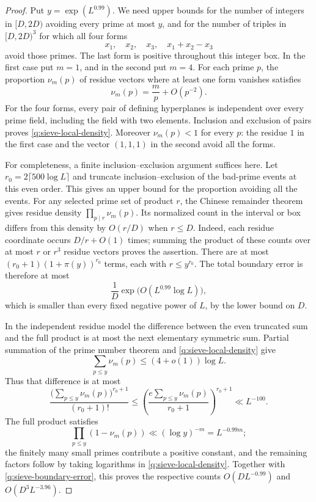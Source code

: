 \begin{proof}
Put $y=\exp(L^{0.99})$. We need upper bounds for the number of integers
in $[D,2D)$ avoiding every prime at most $y$, and for the number of triples
in $[D,2D)^3$ for which all four forms
\[
 x_1,\quad x_2,\quad x_3,\quad x_1+x_2-x_3
\]
avoid those primes. The last form is positive throughout this integer box.
In the first case put $m=1$, and in the second put $m=4$. For each prime $p$,
the proportion $\nu_m(p)$ of residue vectors where at least one form
vanishes satisfies
\begin{equation}\label{q:sieve-local-density}
 \nu_m(p)=\frac mp+O(p^{-2}).
\end{equation}
For the four forms, every pair of defining hyperplanes is independent over
every prime field, including the field with two elements. Inclusion and
exclusion of pairs proves \eqref{q:sieve-local-density}. Moreover
$\nu_m(p)<1$ for every $p$: the residue $1$ in the first case and the vector
$(1,1,1)$ in the second avoid all the forms.

For completeness, a finite inclusion--exclusion argument suffices here.
Let $r_0=2\lceil500\log L\rceil$ and truncate inclusion--exclusion of the
bad-prime events at this even order. This gives an upper bound for the
proportion avoiding all the events. For any selected prime set of product
$r$, the Chinese remainder theorem gives residue density
$\prod_{p\mid r}\nu_m(p)$. Its normalized count in the interval or box
differs from this density by $O(r/D)$ when $r\le D$. Indeed, each residue
coordinate occurs $D/r+O(1)$ times; summing the product of these counts over
at most $r$ or $r^3$ residue vectors proves the assertion.
There are at most
$(r_0+1)(1+\pi(y))^{r_0}$ terms, each with $r\le y^{r_0}$.
The total boundary error is therefore at most
\begin{equation}\label{q:sieve-boundary-error}
 \frac1D\exp\bigl(O(L^{0.99}\log L)\bigr),
\end{equation}
which is smaller than every fixed negative power of $L$, by the lower bound
on $D$.

In the independent residue model the difference between the even truncated
sum and the full product is at most the next elementary symmetric sum.
Partial summation of the prime number theorem and
\eqref{q:sieve-local-density} give
\[
 \sum_{p\le y}\nu_m(p)\le(4+o(1))\log L.
\]
Thus that difference is at most
\[
 \frac{\bigl(\sum_{p\le y}\nu_m(p)\bigr)^{r_0+1}}{(r_0+1)!}
 \le
 \left(\frac{e\sum_{p\le y}\nu_m(p)}{r_0+1}\right)^{r_0+1}
 \ll L^{-100}.
\]
The full product satisfies
\[
 \prod_{p\le y}(1-\nu_m(p))\ll(\log y)^{-m}=L^{-0.99m};
\]
the finitely many small primes contribute a positive constant, and the
remaining factors follow by taking logarithms in
\eqref{q:sieve-local-density}. Together with
\eqref{q:sieve-boundary-error}, this proves the respective counts
$O(DL^{-0.99})$ and $O(D^3L^{-3.96})$.


\end{proof}
